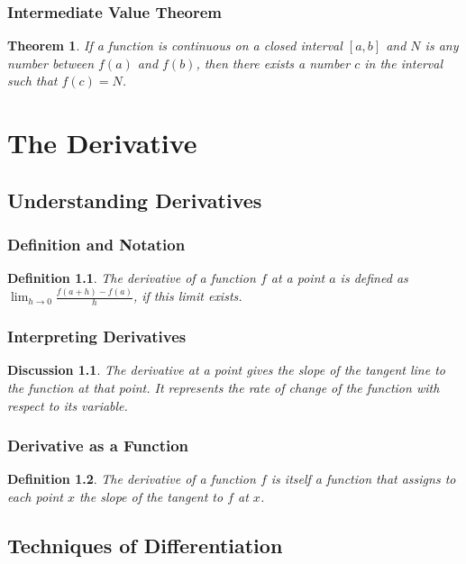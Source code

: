 \documentclass[a4paper,12pt]{book}
\newtheorem{theorem}{Theorem}
\newtheorem{definition}{Definition}
\newtheorem{discussion}{Discussion}
\begin{document}
\subsection{Intermediate Value Theorem}
\begin{theorem}
If a function is continuous on a closed interval \([a, b]\) and \( N \) is any number between \( f(a) \) and \( f(b) \), then there exists a number \( c \) in the interval such that \( f(c) = N \).
\end{theorem}

\chapter{The Derivative}
\section{Understanding Derivatives}
\subsection{Definition and Notation}
\begin{definition}
The derivative of a function \( f \) at a point \( a \) is defined as \(\lim_{h \to 0} \frac{f(a+h) - f(a)}{h}\), if this limit exists.
\end{definition}

\subsection{Interpreting Derivatives}
\begin{discussion}
The derivative at a point gives the slope of the tangent line to the function at that point. It represents the rate of change of the function with respect to its variable.
\end{discussion}

\subsection{Derivative as a Function}
\begin{definition}
The derivative of a function \( f \) is itself a function that assigns to each point \( x \) the slope of the tangent to \( f \) at \( x \).
\end{definition}

\section{Techniques of Differentiation}
\end{document}
